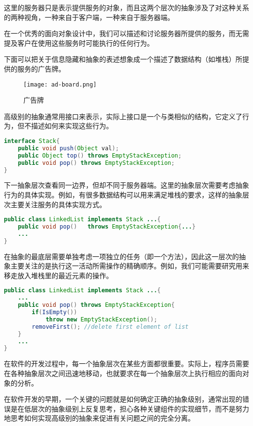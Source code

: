 这里的服务器只是表示提供服务的对象，而且这两个层次的抽象涉及了对这种关系的两种视角，一种来自于客户端，一种来自于服务器端。


在一个优秀的面向对象设计中，我们可以描述和讨论服务器所提供的服务，而无需提及客户在使用这些服务时可能执行的任何行为。

下面可以把关于信息隐藏和抽象的表述想象成一个描述了数据结构（如堆栈）所提供的服务的广告牌。


\begin{figure}[htbp]
\centering
\texttt{[image: ad-board.png]}
\caption{广告牌}
\label{fig:ad-board}
\end{figure}

高级别的抽象通常用接口来表示，实际上接口是一个与类相似的结构，它定义了行为，但不描述如何来实现这些行为。

\begin{lstlisting}[language=Java]
interface Stack{
	public void push(Object val);
	public Object top() throws EmptyStackException;
	public void pop() throws EmptyStackException;
}
\end{lstlisting}


下一抽象层次查看同一边界，但却不同于服务器端。这里的抽象层次需要考虑抽象行为的具体实现。例如，有很多数据结构可以用来满足堆栈的要求，这样的抽象层次主要关注服务的具体实现方式。

\begin{lstlisting}[language=Java]
public class LinkedList implements Stack ...{
	public void pop()	throws EmptyStackException{...}
	...
}
\end{lstlisting}


在抽象的最底层需要单独考虑一项独立的任务（即一个方法），因此这一层次的抽象主要关注的是执行这一活动所需操作的精确顺序。例如，我们可能需要研究用来移走放入堆栈里的最近元素的操作。

\begin{lstlisting}[language=Java]
public class LinkedList implements Stack ...{
	...
	public void pop() throws EmptyStackException{
		if(IsEmpty())
			throw new EmptyStackException();
		removeFirst(); //delete first element of list
	}
	...	
}
\end{lstlisting}

在软件的开发过程中，每一个抽象层次在某些方面都很重要。实际上，程序员需要在各种抽象层次之间迅速地移动，也就要求在每一个抽象层次上执行相应的面向对象的分析。

在软件开发的早期，一个关键的问题就是如何确定正确的抽象级别，通常出现的错误是在低层次的抽象级别上反复思考，担心各种关键组件的实现细节，而不是努力地思考如何实现高级别的抽象来促进有关问题之间的完全分离。

